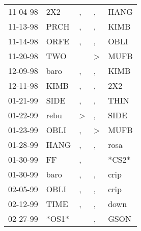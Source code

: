 \begin{supertabular}{p{0.07\textwidth}p{0.06\textwidth}p{0.02\textwidth}p{0.02\textwidth}p{0.06\textwidth}}
 11-04-98\textsuperscript{} &            2X2\textsuperscript{} &                , &             , &           HANG\textsuperscript{} \\
 11-13-98\textsuperscript{} &           PRCH\textsuperscript{} &                , &             , &           KIMB\textsuperscript{} \\
 11-14-98\textsuperscript{} &           ORFE\textsuperscript{} &                , &             , &           OBLI\textsuperscript{} \\
 11-20-98\textsuperscript{} &            TWO\textsuperscript{} &                  &  \textgreater &           MUFB\textsuperscript{} \\
 12-09-98\textsuperscript{} &           baro\textsuperscript{} &                , &             , &           KIMB\textsuperscript{} \\
 12-11-98\textsuperscript{} &           KIMB\textsuperscript{} &                , &             , &            2X2\textsuperscript{} \\
 01-21-99\textsuperscript{} &           SIDE\textsuperscript{} &                , &             , &           THIN\textsuperscript{} \\
 01-22-99\textsuperscript{} &           rebu\textsuperscript{} &     \textgreater &             , &           SIDE\textsuperscript{} \\
 01-23-99\textsuperscript{} &           OBLI\textsuperscript{} &                , &  \textgreater &           MUFB\textsuperscript{} \\
 01-28-99\textsuperscript{} &           HANG\textsuperscript{} &                , &             , &           rosa\textsuperscript{} \\
 01-30-99\textsuperscript{} &             FF\textsuperscript{} &                , &               &                            *CS2* \\
 01-30-99\textsuperscript{} &           baro\textsuperscript{} &                , &             , &           crip\textsuperscript{} \\
 02-05-99\textsuperscript{} &           OBLI\textsuperscript{} &                , &             , &           crip\textsuperscript{} \\
 02-12-99\textsuperscript{} &           TIME\textsuperscript{} &                , &             , &           down\textsuperscript{} \\
 02-27-99\textsuperscript{} &                            *OS1* &                  &             , &           GSON\textsuperscript{} \\

\end{supertabular}
